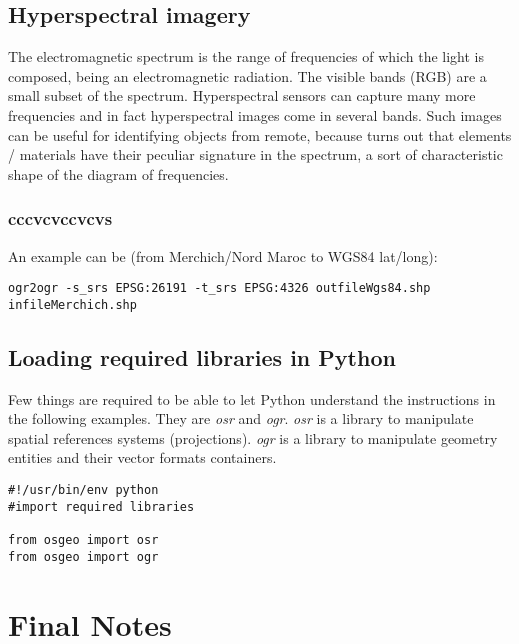 \documentclass[10pt]{book}
\begin{document}
\section{Hyperspectral imagery}
The electromagnetic spectrum is the range of frequencies of which the light is composed, being an electromagnetic 
radiation. The visible bands (RGB) are a small subset of the spectrum. Hyperspectral sensors can capture many more frequencies and
in fact hyperspectral images come in several bands. 
Such images can be useful for identifying objects from remote, because turns out that elements / materials have their peculiar
signature in the spectrum, a sort of characteristic shape of the diagram of frequencies. 
\subsection{cccvcvccvcvs}


\noindent An example can be (from Merchich/Nord Maroc to WGS84 lat/long):

\begin{verbatim}
ogr2ogr -s_srs EPSG:26191 -t_srs EPSG:4326 outfileWgs84.shp infileMerchich.shp
\end{verbatim}

\section{Loading required libraries in Python}
Few things are required to be able to let Python understand the instructions in the following examples. 
They are {\it osr} and {\it ogr}. {\it osr} is a library to manipulate spatial references systems (projections).
{\it ogr} is a library to manipulate geometry entities and their vector formats containers.

\begin{verbatim}
#!/usr/bin/env python
#import required libraries

from osgeo import osr
from osgeo import ogr
\end{verbatim}

\newpage

\newpage


\chapter{Final Notes}
\end{document}
